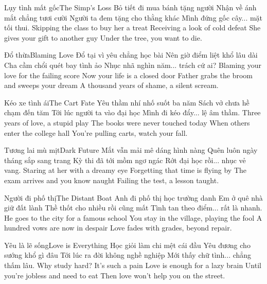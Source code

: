 \begin{tutuyetbox}{Lụy tình mất gốc}{The Simp's Loss}
Bỏ tiết đi mua bánh tặng người
Nhận về ánh mắt chẳng tươi cười
Người ta đem tặng cho thằng khác
Mình đứng gốc cây... mặt tối thui.
\tcblower
Skipping the class to buy her a treat
Receiving a look of cold defeat
She gives your gift to another guy
Under the tree, you want to die.
\end{tutuyetbox}

\begin{tutuyetbox}{Đổ thừa}{Blaming Love}
Đổ tại vì yêu chẳng học bài
Nên giờ điểm liệt khổ lâu dài
Cha cầm chổi quét bay tình ảo
Nhục nhã nghìn năm... trách cứ ai?
\tcblower
Blaming your love for the failing score
Now your life is a closed door
Father grabs the broom and sweeps your dream
A thousand years of shame, a silent scream.
\end{tutuyetbox}

\begin{tutuyetbox}{Kéo xe tình ái}{The Cart Fate}
Yêu thầm nhí nhố suốt ba năm
Sách vở chưa hề chạm đến tăm
Tới lúc người ta vào đại học
Mình đi kéo đẩy... lệ âm thầm.
\tcblower
Three years of love, a stupid play
The books were never touched today
When others enter the college hall
You're pulling carts, watch your fall.
\end{tutuyetbox}

\begin{tutuyetbox}{Tương lai mù mịt}{Dark Future}
Mắt vẫn mải mê dáng hình nàng
Quên luôn ngày tháng sắp sang trang
Kỳ thi đã tới mồm ngơ ngác
Rớt đại học rồi... nhục vẻ vang.
\tcblower
Staring at her with a dreamy eye
Forgetting that time is flying by
The exam arrives and you know naught
Failing the test, a lesson taught.
\end{tutuyetbox}

\begin{tutuyetbox}{Người đi phố thị}{The Distant Boat}
Anh đi phố thị học trường danh
Em ở quê nhà giữ đất lành
Thề thốt cho nhiều rồi cũng mất
Tình tan theo điểm... rất là nhanh.
\tcblower
He goes to the city for a famous school
You stay in the village, playing the fool
A hundred vows are now in despair
Love fades with grades, beyond repair.
\end{tutuyetbox}

\begin{tutuyetbox}{Yêu là lẽ sống}{Love is Everything}
Học giỏi làm chi mệt cái đầu
Yêu đương cho sướng khổ gì đâu
Tới lúc ra đời không nghề nghiệp
Mới thấy chữ tình... chẳng thấm lâu.
\tcblower
Why study hard? It's such a pain
Love is enough for a lazy brain
Until you're jobless and need to eat
Then love won't help you on the street.
\end{tutuyetbox}

